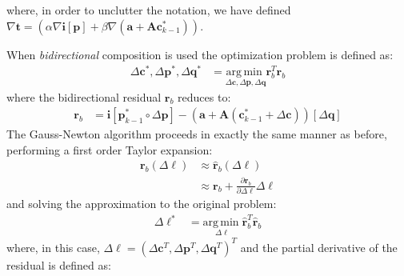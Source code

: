 where, in order to unclutter the notation, we have defined $\nabla\mathbf{t} = \left( \alpha \nabla \mathbf{i}[\mathbf{p}]  + \beta \nabla (\mathbf{a} + \mathbf{A}\mathbf{c}_{k-1}^*) \right)$.

When \emph{bidirectional} composition is used the optimization problem is defined as:
\begin{equation}
    \begin{aligned}
        \Delta \mathbf{c}^*, \Delta \mathbf{p}^*, \Delta \mathbf{q}^*& = \underset{\Delta \mathbf{c}, \Delta \mathbf{p}, \Delta \mathbf{q}}{\mathrm{arg\,min\;}} \mathbf{r}_b^T\mathbf{r}_b
    \label{eq:bidirectional_ssd}
    \end{aligned}
\end{equation}
where the bidirectional residual $\mathbf{r}_b$ reduces to: 
\begin{equation}
    \begin{aligned}
		\mathbf{r}_b & = \mathbf{i}[\mathbf{p}_{k-1}^* \circ \Delta \mathbf{p}] - (\mathbf{a} + \mathbf{A}(\mathbf{c}^*_{k-1} + \Delta\mathbf{c})) [\Delta \mathbf{q}]
    \label{eq:bidirectional_residual}
    \end{aligned}
\end{equation}
The Gauss-Newton algorithm proceeds in exactly the same manner as before, performing a first order Taylor expansion:
\begin{equation}
    \begin{aligned}
		\mathbf{r}_b(\Delta \boldsymbol{\ell}) & \approx \hat{\mathbf{r}}_b(\Delta \boldsymbol{\ell})
		\\
		& \approx \mathbf{r}_b + \frac{\partial \mathbf{r}_b}{\partial \Delta \boldsymbol{\ell}} \Delta \boldsymbol{\ell}
    \label{eq:idirectional_residual_taylor}
    \end{aligned}
\end{equation}
and solving the approximation to the original problem:
\begin{equation}
    \begin{aligned}
        \Delta \boldsymbol{\ell}^* & = \underset{\Delta \boldsymbol{\ell}}{\mathrm{arg\,min\;}} \hat{\mathbf{r}}_b^T\hat{\mathbf{r}}_b
    \label{eq:bidirectional_ssd_taylor}
    \end{aligned}
\end{equation}
where, in this case, $\Delta \boldsymbol{\ell} = (\Delta \mathbf{c}^T, \Delta \mathbf{p}^T, \Delta \mathbf{q}^T)^T$ and the partial derivative of the residual is defined as: 
